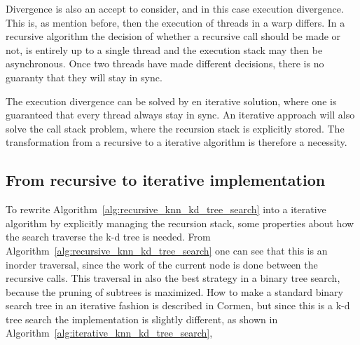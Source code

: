 Divergence is also an accept to consider, and in this case execution divergence. This is, as mention before, then the execution of threads in a warp differs. In a recursive algorithm the decision of whether a recursive call should be made or not, is entirely up to a single thread and the execution stack may then be asynchronous. Once two threads have made different decisions, there is no guaranty that they will stay in sync.

The execution divergence can be solved by en iterative solution, where one is guaranteed that every thread always stay in sync. An iterative approach will also solve the call stack problem, where the recursion stack is explicitly stored. The transformation from a recursive to a iterative algorithm is therefore a necessity.



\subsection{From recursive to iterative implementation} %
\label{sub:from_recursive_to_iterative_implementation}


To rewrite Algorithm~\ref{alg:recursive_knn_kd_tree_search} into a iterative algorithm by explicitly managing the recursion stack, some properties about how the search traverse the k-d tree is needed. From Algorithm~\ref{alg:recursive_knn_kd_tree_search} one can see that this is an inorder traversal, since the work of the current node is done between the recursive calls. This traversal in also the best strategy in a binary tree search, because the pruning of subtrees is maximized. How to make a standard binary search tree in an iterative fashion is described in Cormen\citep[Chapter 12]{Cormen:2001}, but since this is a k-d tree search the implementation is slightly different, as shown in Algorithm~\ref{alg:iterative_knn_kd_tree_search},

